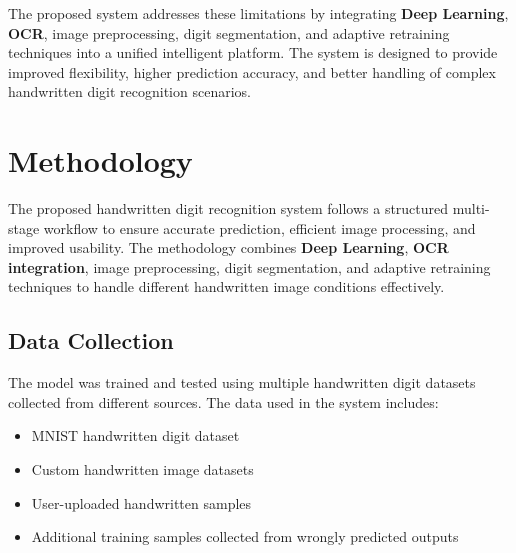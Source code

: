 \documentclass[12pt,a4paper]{article}
\begin{document}
\vspace{0.3cm}

\noindent
The proposed system addresses these limitations by integrating \textbf{Deep Learning}, \textbf{OCR}, image preprocessing, digit segmentation, and adaptive retraining techniques into a unified intelligent platform. The system is designed to provide improved flexibility, higher prediction accuracy, and better handling of complex handwritten digit recognition scenarios.

\newpage

\section{Methodology}

\vspace{0.3cm}

\noindent
The proposed handwritten digit recognition system follows a structured multi-stage workflow to ensure accurate prediction, efficient image processing, and improved usability. The methodology combines \textbf{Deep Learning}, \textbf{OCR integration}, image preprocessing, digit segmentation, and adaptive retraining techniques to handle different handwritten image conditions effectively.

\vspace{0.4cm}


\subsection{Data Collection}

\vspace{0.2cm}

\noindent
The model was trained and tested using multiple handwritten digit datasets collected from different sources. The data used in the system includes:

\begin{itemize}
\item {MNIST handwritten digit dataset}
\item {Custom handwritten image datasets}
\item {User-uploaded handwritten samples}
\item {Additional training samples collected from wrongly predicted outputs}
\end{itemize}

\vspace{0.2cm}
\end{document}
